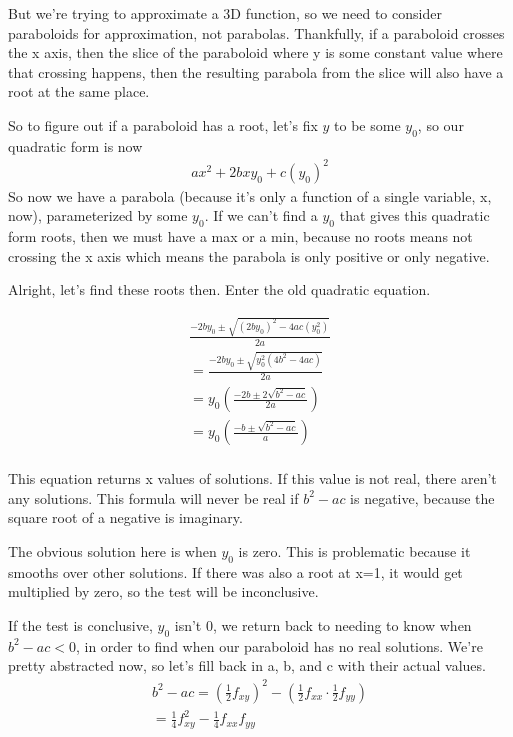 \documentclass[12pt, letterpaper]{article}
\begin{document}
But we're trying to approximate a 3D function, so we need to consider paraboloids for approximation, not parabolas. Thankfully, if a paraboloid crosses the x axis, then the slice of the paraboloid where y is some constant value where that crossing happens, then the resulting parabola from the slice will also have a root at the same place.

So to figure out if a paraboloid has a root, let's fix $y$ to be some $y_0$, so our quadratic form is now
\begin{gather*}
    ax^2 + 2bxy_0 + c(y_0)^2
\end{gather*}
So now we have a parabola (because it's only a function of a single variable, x, now), parameterized by some $y_0$. If we can't find a $y_0$ that gives this quadratic form roots, then we must have a max or a min, because no roots means not crossing the x axis which means the parabola is only positive or only negative.

Alright, let's find these roots then. Enter the old quadratic equation.

\begin{gather*}
    \frac{-2by_0 \pm \sqrt{(2by_0)^2 - 4ac(y_0^2)}}{2a} \\
    =\frac{-2by_0 \pm \sqrt{y_0^2 (4b^2 - 4ac)}}{2a}\\
    =y_0\left(\frac{-2b \pm 2\sqrt{b^2 - ac}}{2a}\right)\\
    =y_0\left(\frac{-b \pm \sqrt{b^2 - ac}}{a}\right)\\
\end{gather*}

This equation returns x values of solutions. If this value is not real, there aren't any solutions. This formula will never be real if $b^2 - ac$ is negative, because the square root of a negative is imaginary.

The obvious solution here is when $y_0$ is zero. This is problematic because it smooths over other solutions. If there was also a root at x=1, it would get multiplied by zero, so the test will be inconclusive.

If the test is conclusive, $y_0$ isn't 0, we return back to needing to know when $b^2 - ac < 0$, in order to find when our paraboloid has no real solutions. We're pretty abstracted now, so let's fill back in a, b, and c with their actual values.
\begin{gather*}
    b^2 - ac = (\frac{1}{2}f_{xy})^2 - (\frac{1}{2}f_{xx} \cdot \frac{1}{2}f_{yy})\\
    = \frac{1}{4}f_{xy}^2 - \frac{1}{4}f_{xx}f_{yy}\\
\end{gather*}
\end{document}
